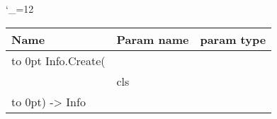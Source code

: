 \begingroup \catcode`\_=12 \tt
\begin{tabular}{lll}
\toprule
\textrm{Name}&\textrm{Param name}&\textrm{param type}\\
\midrule
\hbox to 0pt {Info.Create(\hss}\\
& cls\\
\hbox to 0pt{) -> Info\hss}\\
\bottomrule
\end{tabular}
\endgroup
